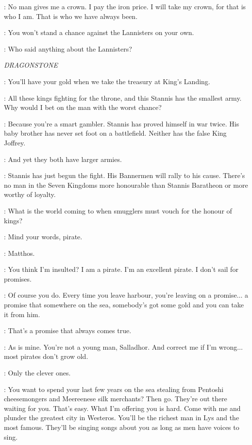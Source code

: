\BALON: No man gives me a crown. I pay the iron price. I will take my crown, for that is who I am. That is who we have always been.


\THEON: You won't stand a chance against the Lannisters on your own.

\BALON: Who said anything about the Lannisters?


\scene

\textit{DRAGONSTONE}


\DAVOS: You'll have your gold when we take the treasury at King's Landing.

\SALLADHOR: All these kings fighting for the throne, and this Stannis has the smallest army. Why would I bet on the man with the worst chance?

\DAVOS: Because you're a smart gambler. Stannis has proved himself in war twice. His baby brother has never set foot on a battlefield. Neither has the false King Joffrey.

\SALLADHOR: And yet they both have larger armies.

\DAVOS: Stannis has just begun the fight. His Bannermen will rally to his cause. There's no man in the Seven Kingdoms more honourable than Stannis Baratheon or more worthy of loyalty.

\SALLADHOR: What is the world coming to when smugglers must vouch for the honour of kings?

\MATTHOS: Mind your words, pirate.

\DAVOS: Matthos.

\SALLADHOR: You think I'm insulted? I am a pirate. I'm an excellent pirate. I don't sail for promises.

\DAVOS: Of course you do. Every time you leave harbour, you're leaving on a promise$\ldots$ a promise that somewhere on the sea, somebody's got some gold and you can take it from him.

\SALLADHOR: That's a promise that always comes true.

\DAVOS: As is mine. You're not a young man, Salladhor. And correct me if I'm wrong$\ldots$ most pirates don't grow old.

\SALLADHOR: Only the clever ones.

\DAVOS: You want to spend your last few years on the sea stealing from Pentoshi cheesemongers and Meereenese silk merchants? Then go. They're out there waiting for you. That's easy. What I'm offering you is hard. Come with me and plunder the greatest city in Westeros. You'll be the richest man in Lys and the most famous. They'll be singing songs about you as long as men have voices to sing.

